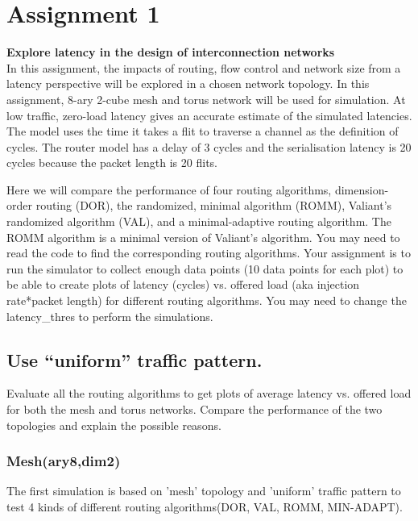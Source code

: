 \chapter{Assignment 1} \label{ch-2}

\textbf{Explore latency in the design of interconnection networks}\\
In this assignment, the impacts of routing, flow control and network size from a latency perspective will be explored in a chosen network topology. In this assignment, 8-ary 2-cube mesh and torus network will be used for simulation. At low traffic, zero-load latency gives an accurate estimate of the simulated latencies. The model uses the time it takes a flit to traverse a channel as the definition of cycles. The router model has a delay of 3 cycles and the serialisation latency is 20 cycles because the packet length is 20 flits.

Here we will compare the performance of four routing algorithms, dimension-order routing (DOR), the randomized, minimal algorithm (ROMM), Valiant’s randomized algorithm (VAL), and a minimal-adaptive routing algorithm. The ROMM algorithm is a minimal version of Valiant’s algorithm. You may need to read the code to find the corresponding routing algorithms. Your assignment is to run the simulator to collect enough data points (10 data points for each plot) to be able to create plots of latency (cycles) vs. offered load (aka injection rate*packet length) for different routing algorithms. You may need to change the latency\_thres to perform the simulations.


\section{Use “uniform” traffic pattern.}

Evaluate all the routing algorithms to get plots of average latency vs. offered load for both the mesh and torus networks. Compare the performance of the two topologies and explain the possible reasons.

\subsection{Mesh(ary8,dim2)}
\label{sec:mesh_uniform}
The first simulation is based on 'mesh' topology and 'uniform' traffic pattern to test 4 kinds of different routing algorithms(DOR, VAL, ROMM, MIN-ADAPT).
